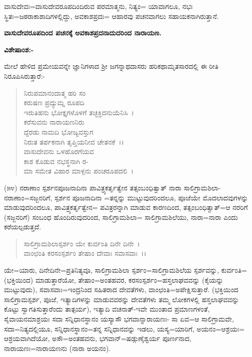 ವಾಸುದೇವಃ=ವಾಸುದೇವರೂಪದಿಂದಿರುವ ಪರಮಾತ್ಮನು, ನಿತ್ಯಂ= ಯಾವಾಗಲೂ, ನಭಃ ಸ್ಥಿತಃ=ಜಠರಾಕಾಶಾದಿಗಳಲ್ಲಿದ್ದು, ಅವಕಾಶಪ್ರದಃ= ಆಹಾರವು ಪಚನವಾಗಲು ಸಹಾಯಕನಾಗಿರುತ್ತಾನೆ.

\begin{center}
\textbf{ವಾಸುದೇವರೂಪದಿಂದ ಪಚನಕ್ಕೆ ಅವಕಾಶಪ್ರದನಾದುದರಿಂದ ನಾರಾಯಣ.}
\end{center}

\noindent
\textbf{ವಿಶೇಷಾಂಶ:-}

ಮೇಲೆ ಹೇಳಿದ ಪ್ರಮೇಯವನ್ನೇ ಜ್ಞಾನಿಗಳಾದ ಶ‍್ರೀ ಜಗನ್ನಾಥದಾಸರು ಹರಿಕಥಾಮೃತಸಾರದಲ್ಲಿ ಈ ರೀತಿ ನಿರೂಪಿಸಿರುತ್ತಾರೆ:-

\begin{verse}
ನಿರುಪಮಾನಂದಾತ್ಮ ಹರಿ ಸಂ\\ ಕರುಷಣ ಪ್ರದ್ಯುಮ್ನ ರೂಪದಿ\\ ಇರುತಿಹನು ಭೋಕ್ತೃಗಳೊಳಗೆ ತಚ್ಛಕ್ತಿದನುಯೆನಿಸಿ~।\\ ಕರೆಸುವನು ನಾರಾಯಣನಿರು\\ ದ್ದೆರಡು ನಾಮದಿ ಭೋಜ್ಯವಸ್ತುಗ\\ ನಿರುತ ತರ್ಪಕನಾಗಿ ತೃಪ್ತಿಯನೀವ ಚೇತನಕೆ~।।\\ ವಾಸುದೇವನು ಒಳಹೊರಗೆಯವ\\ ಕಾಶ ಕೊಡುವ ನಭಸ್ಥನಾಗಿ ರ-\\ ಮಾ ಸಮೇತ ವಿಹಾರ ಮಾಳ್ಪನು ಪಂಚರೂಪದಲಿ~।
\end{verse}

(೫೪) ನರಾಣಾಂ ಸ್ಪರ್ಶನಪೂಜನಾದಿನಾ ಪಾವಿತ್ರ್ಯಕರ್ತೃತ್ವೇನ ತತ್ಸಂಬಂಧಿತ್ವಾತ್ ನಾರಾ ಸಾಲಿಗ್ರಾಮಶಿಲಾ-ನರಾಣಾಂ=ಸಜ್ಜನರಿಗೆ, ಸ್ಪರ್ಶನ ಪೂಜನಾದಿನಾ =ತನ್ನನ್ನು ಮುಟ್ಟುವುದರಿಂದಲೂ, ಪೂಜೆಯೇ ಮೊದಲಾದವುಗಳನ್ನು ಮಾಡುವುದರಿಂದಲೂ, ಪಾವಿತ್ರ್ಯಕರ್ತೃತ್ವೇನ= ಪವಿತ್ರರನ್ನಾಗಿ ಮಾಡುವ ಕಾರಣದಿಂದ, ತತ್ಸಂಬಂಧಿತ್ವಾತ್=ಆ ನರರಿಗೆ (ಸಜ್ಜನರಿಗೆ) ಸಂಬಂಧ ಹೊಂದಿರುವುದರಿಂದ, ಸಾಲಿಗ್ರಾಮಶಿಲಾ= ಸಾಲಿಗ್ರಾಮಶಿಲೆಯು, ನಾರಾ=ನಾರಾ ಎಂದು ಕರೆಯಲ್ಪಡುತ್ತದೆ.

\begin{verse}
ಸಾಲಿಗ್ರಾಮಶಿಲಾಸ್ಪರ್ಶಂ ಯೇ ಕುರ್ವಂತಿ ದಿನೇ ದಿನೇ~। \\ವಾಂಛಂತಿ ಕರಸಂಸ್ಪರ್ಶಂ ತೇಷಾಂ ದೇವಾಃ ಸವಾಸವಾಃ~।।
\end{verse}

ಯೇ=ಯಾರು, ದಿನೇದಿನೇ=ಪ್ರತಿನಿತ್ಯವೂ, ಸಾಲಿಗ್ರಾಮಶಿಲಾ ಸ್ಪರ್ಶಂ=ಸಾಲಿಗ್ರಾಮಶಿಲೆಯ ಸ್ಪರ್ಶವನ್ನು, ಕುರ್ವಂತಿ=(ಭಕ್ತಿಯಿಂದ) ಮಾಡುತ್ತಾರೆಯೋ, ತೇಷಾಂ=ಅಂತಹವರ, ಕರಸಂಸ್ಪರ್ಶಂ=ಹಸ್ತಲಾಘವವನ್ನು (ಕೈಯನ್ನು ಮುಟ್ಟುವುದು), ಸವಾಸವಾಃ=ಇಂದ್ರನಿಂದ ಸಹಿತರಾದ ದೇವತೆಗಳು, ವಾಂಛಂತಿ=ಅಪೇಕ್ಷಿಸುತ್ತಾರೆ. (ಭಕ್ತಿಯಿಂದ ಸಾಲಿಗ್ರಾಮಸ್ಪರ್ಶ, ಪೂಜೆ, ಇತ್ಯಾದಿಗಳನ್ನು ಮಾಡುವವರನ್ನು ದೇವತೆಗಳು ತಮ್ಮ ಲೋಕಗಳಲ್ಲಿ ಹಸ್ತಲಾಘವವನ್ನು ಕೊಟ್ಟು ಸ್ವಾಗತಿಸುತ್ತಾರೆಂದು ತಾತ್ಪರ್ಯ), ಇತ್ಯಾದಿ ವಚನಾತ್-ಇವೇ ಮುಂತಾದ ಪ್ರಮಾಣಗಳಂತೆ, ಸೈವಾಯನಮಾಶ್ರಯಃ ಸದಾ ಸನ್ನಿಧಾನಸ್ಥಾನಂ ಯಸ್ಯಾಸೌ ಭಗವಾನ್ನಾರಾಯಣಃ- ಸಾ ಏವ=ಆ ಸಾಲಿಗ್ರಾಮವೇ, ಸದಾ=ನಿತ್ಯದಲ್ಲಿಯೂ, ಸನ್ನಿಧಾನಸ್ಥಾನಂ=ತನ್ನ ಸನ್ನಿಧಾನವನ್ನು ಇಡಲು, ಯಸ್ಯ=ಯಾರಿಗೆ, ಅಯನಂ=ಆಶ್ರಯಃ= ಆಶ್ರಯವಾಗಿದೆಯೋ, ಅಸೌ=ಅಂತಹವನು, ಭಗವಾನ್=ಷಡ್ಗುಣೈಶ್ವರ್ಯ ಪೂರ್ಣನಾದ, ನಾರಾಯಣಃ=ನಾರಾಯಣನು (ನಾರಾ ಅಯನಂ).

